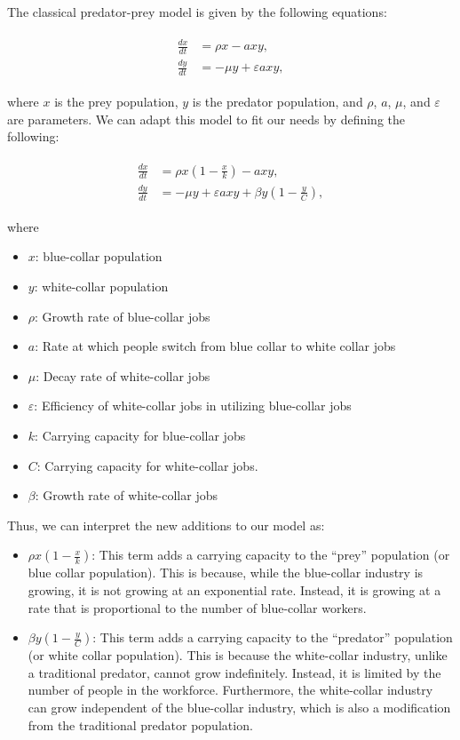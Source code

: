 \documentclass[11pt]{amsart}
\begin{document}
The classical predator-prey model is given by the following equations:

\begin{align}
    \begin{split}
        \frac{dx}{dt} &= \rho x - a x y, \\
        \frac{dy}{dt} &= -\mu y + \varepsilon a x y,
    \end{split}
\end{align}

where $x$ is the prey population, $y$ is the predator population, and $\rho$, $a$, $\mu$, and $\varepsilon$ are parameters. 
We can adapt this model to fit our needs by defining the following:

\begin{align}
    \begin{split}
        \frac{dx}{dt} &= \rho x \left(1-\frac{x}{k}\right) - a x y, \\
        \frac{dy}{dt} &= -\mu y + \varepsilon a x y + \beta y \left(1-\frac{y}{C}\right),
    \end{split}
\end{align}

where 

\begin{itemize}
    \item $x$: blue-collar population
    \item $y$: white-collar population
    \item $\rho$: Growth rate of blue-collar jobs
    \item $a$: Rate at which people switch from blue collar to white collar jobs
    \item $\mu$: Decay rate of white-collar jobs
    \item $\varepsilon$: Efficiency of white-collar jobs in utilizing blue-collar jobs
    \item $k$: Carrying capacity for blue-collar jobs
    \item $C$: Carrying capacity for white-collar jobs.
    \item $\beta$: Growth rate of white-collar jobs
\end{itemize}

Thus, we can interpret the new additions to our model as:

\begin{itemize}
    \item $\rho x (1-\frac{x}{k})$: This term adds a carrying capacity to the ``prey'' population (or blue collar population). This is because, while the blue-collar industry is growing, it is not growing at an exponential rate. Instead, it is growing at a rate that is proportional to the number of blue-collar workers.
    \item $\beta y (1-\frac{y}{C})$: This term adds a carrying capacity to the ``predator'' population (or white collar population). This is because the white-collar industry, unlike a traditional predator, cannot grow indefinitely. Instead, it is limited by the number of people in the workforce. Furthermore, the white-collar industry can grow independent of the blue-collar industry, which is also a modification from the traditional predator population.
\end{itemize}
\end{document}
